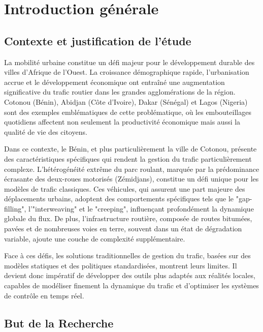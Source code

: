 \chapter{Introduction générale}
\label{chap:intro}

\section{Contexte et justification de l'étude}
\label{sec:contexte_justification}

La mobilité urbaine constitue un défi majeur pour le développement durable des villes d'Afrique de l'Ouest. La croissance démographique rapide, l'urbanisation accrue et le développement économique ont entraîné une augmentation significative du trafic routier dans les grandes agglomérations de la région. Cotonou (Bénin), Abidjan (Côte d'Ivoire), Dakar (Sénégal) et Lagos (Nigeria) sont des exemples emblématiques de cette problématique, où les embouteillages quotidiens affectent non seulement la productivité économique mais aussi la qualité de vie des citoyens.

Dans ce contexte, le Bénin, et plus particulièrement la ville de Cotonou, présente des caractéristiques spécifiques qui rendent la gestion du trafic particulièrement complexe. L'hétérogénéité extrême du parc roulant, marquée par la prédominance écrasante des deux-roues motorisés (Zémidjans), constitue un défi unique pour les modèles de trafic classiques. Ces véhicules, qui assurent une part majeure des déplacements urbains, adoptent des comportements spécifiques tels que le "gap-filling", l'"interweaving" et le "creeping", influençant profondément la dynamique globale du flux. De plus, l'infrastructure routière, composée de routes bitumées, pavées et de nombreuses voies en terre, souvent dans un état de dégradation variable, ajoute une couche de complexité supplémentaire.

Face à ces défis, les solutions traditionnelles de gestion du trafic, basées sur des modèles statiques et des politiques standardisées, montrent leurs limites. Il devient donc impératif de développer des outils plus adaptés aux réalités locales, capables de modéliser finement la dynamique du trafic et d'optimiser les systèmes de contrôle en temps réel.

\section{But de la Recherche}
\label{sec:but_recherche}

